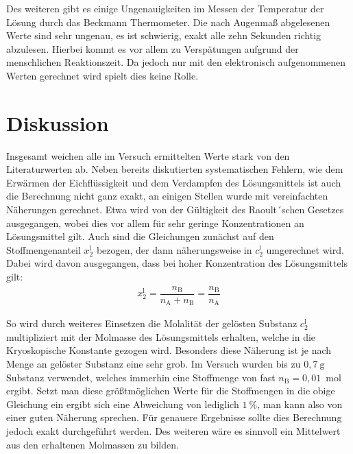 \documentclass[12pt,a4paper,titlepage,headinclude,bibtotoc]{scrartcl}
\begin{document}
Des weiteren gibt es einige Ungenauigkeiten im Messen der Temperatur der Lösung durch das Beckmann Thermometer. Die nach Augenmaß abgelesenen Werte sind sehr ungenau, es ist schwierig, exakt alle zehn Sekunden richtig abzulesen. Hierbei kommt es vor allem zu Verspätungen aufgrund der menschlichen Reaktionszeit. Da jedoch nur mit den elektronisch aufgenommenen Werten gerechnet wird spielt dies keine Rolle.

\section{Diskussion}

Insgesamt weichen alle im Versuch ermittelten Werte stark von den Literaturwerten ab. Neben bereits diskutierten systematischen Fehlern, wie dem Erwärmen der Eichflüssigkeit und dem Verdampfen des Lösungsmittels ist auch die Berechnung nicht ganz exakt, an einigen Stellen wurde mit vereinfachten Näherungen gerechnet. Etwa wird von der Gültigkeit des Raoult´schen Gesetzes ausgegangen, wobei dies vor allem für sehr geringe Konzentrationen an Lösungsmittel gilt. Auch sind die Gleichungen zunächst auf den Stoffmengenanteil $x_2^\mathrm{l}$ bezogen, der dann näherungsweise in $c_2^l$ umgerechnet wird. Dabei wird davon ausgegangen, dass bei hoher Konzentration des Lösungsmittels gilt:
\begin{align}
x_2^\mathrm{l} = \dfrac{n_\mathrm{B}}{n_\mathrm{A} + n_\mathrm{B}} = \dfrac{n_\mathrm{B}}{n_\mathrm{A}}
\end{align}   

So wird durch weiteres Einsetzen die Molalität der gelösten Substanz $c_2^\mathrm{l}$ multipliziert mit der Molmasse des Lösungsmittels erhalten, welche in die Kryoskopische Konstante gezogen wird. Besonders diese Näherung ist je nach Menge an gelöster Substanz eine sehr grob. Im Versuch wurden bis zu $0,7{~}\mathrm{g}$ Substanz verwendet, welches immerhin eine Stoffmenge von fast $n_\mathrm{B} = 0,01${~}mol ergibt. Setzt man diese größtmöglichen Werte für die Stoffmengen in die obige Gleichung ein ergibt sich eine Abweichung von lediglich $1 {~} \% $, man kann also von einer guten Näherung sprechen. Für genauere Ergebnisse sollte dies Berechnung jedoch exakt durchgeführt werden. Des weiteren wäre es sinnvoll ein Mittelwert aus den erhaltenen Molmassen zu bilden.  
 


 
\end{document}
